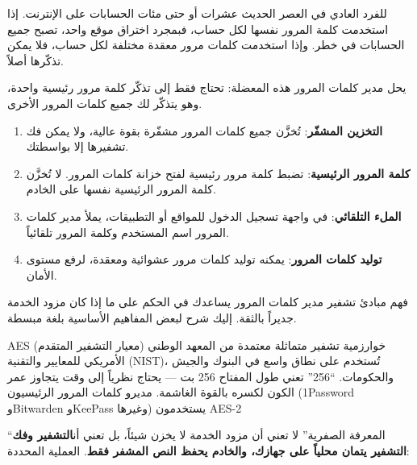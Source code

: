 


للفرد العادي في العصر الحديث عشرات أو حتى مئات الحسابات على الإنترنت. إذا استخدمت كلمة المرور نفسها لكل حساب، فبمجرد اختراق موقع واحد، تصبح جميع الحسابات في خطر. وإذا استخدمت كلمات مرور معقدة مختلفة لكل حساب، فلا يمكن تذكّرها أصلاً.

يحل مدير كلمات المرور هذه المعضلة: تحتاج فقط إلى تذكّر كلمة مرور رئيسية واحدة، وهو يتذكّر لك جميع كلمات المرور الأخرى.


\begin{enumerate}
  \item \textbf{التخزين المشفّر}: تُخزَّن جميع كلمات المرور مشفّرة بقوة عالية، ولا يمكن فك تشفيرها إلا بواسطتك.
  \item \textbf{كلمة المرور الرئيسية}: تضبط كلمة مرور رئيسية لفتح خزانة كلمات المرور. لا تُخزَّن كلمة المرور الرئيسية نفسها على الخادم.
  \item \textbf{الملء التلقائي}: في واجهة تسجيل الدخول للمواقع أو التطبيقات، يملأ مدير كلمات المرور اسم المستخدم وكلمة المرور تلقائياً.
  \item \textbf{توليد كلمات المرور}: يمكنه توليد كلمات مرور عشوائية ومعقدة، لرفع مستوى الأمان.
\end{enumerate}


فهم مبادئ تشفير مدير كلمات المرور يساعدك في الحكم على ما إذا كان مزود الخدمة جديراً بالثقة. إليك شرح لبعض المفاهيم الأساسية بلغة مبسطة.


AES (معيار التشفير المتقدم) خوارزمية تشفير متماثلة معتمدة من المعهد الوطني الأمريكي للمعايير والتقنية (NIST)، تُستخدم على نطاق واسع في البنوك والجيش والحكومات. “256” تعني طول المفتاح 256 بت — يحتاج نظرياً إلى وقت يتجاوز عمر الكون لكسره بالقوة الغاشمة. مديرو كلمات المرور الرئيسيون (1Password وBitwarden وKeePass وغيرها) يستخدمون AES-2


“المعرفة الصفرية” لا تعني أن مزود الخدمة لا يخزن شيئاً، بل تعني أن\textbf{التشفير وفك التشفير يتمان محلياً على جهازك، والخادم يحفظ النص المشفر فقط}. العملية المحددة:

